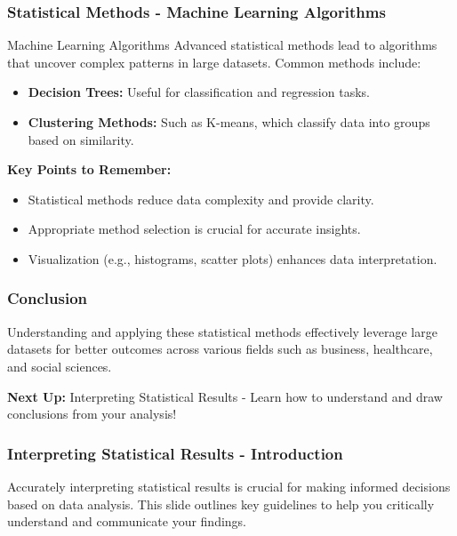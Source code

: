 \documentclass[aspectratio=169]{beamer}
\begin{document}
\begin{frame}[fragile]
    \frametitle{Statistical Methods - Machine Learning Algorithms}
    \begin{block}{Machine Learning Algorithms}
        Advanced statistical methods lead to algorithms that uncover complex patterns in large datasets. Common methods include:
        \begin{itemize}
            \item \textbf{Decision Trees:} Useful for classification and regression tasks.
            \item \textbf{Clustering Methods:} Such as K-means, which classify data into groups based on similarity.
        \end{itemize}
    \end{block}
    
    \textbf{Key Points to Remember:}
    \begin{itemize}
        \item Statistical methods reduce data complexity and provide clarity.
        \item Appropriate method selection is crucial for accurate insights.
        \item Visualization (e.g., histograms, scatter plots) enhances data interpretation.
    \end{itemize}
\end{frame}

\begin{frame}[fragile]
    \frametitle{Conclusion}
    Understanding and applying these statistical methods effectively leverage large datasets for better outcomes across various fields such as business, healthcare, and social sciences. 
    
    \textbf{Next Up:} Interpreting Statistical Results - Learn how to understand and draw conclusions from your analysis!
\end{frame}

\begin{frame}[fragile]
    \frametitle{Interpreting Statistical Results - Introduction}
    Accurately interpreting statistical results is crucial for making informed decisions based on data analysis. 
    This slide outlines key guidelines to help you critically understand and communicate your findings.
\end{frame}
\end{document}
